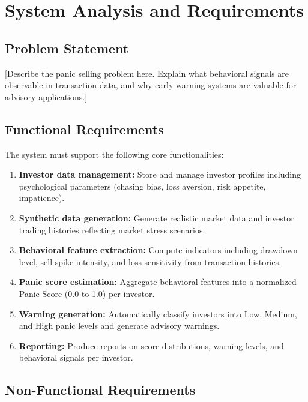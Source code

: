 \chapter{System Analysis and Requirements}
\label{chap:analysis}

\section{Problem Statement}


[Describe the panic selling problem here. Explain what behavioral signals are observable in transaction data, and why early warning systems are valuable for advisory applications.]

\section{Functional Requirements}

The system must support the following core functionalities:

\begin{enumerate}
    \item \textbf{Investor data management:} Store and manage investor profiles including psychological parameters (chasing bias, loss aversion, risk appetite, impatience).
    \item \textbf{Synthetic data generation:} Generate realistic market data and investor trading histories reflecting market stress scenarios.
    \item \textbf{Behavioral feature extraction:} Compute indicators including drawdown level, sell spike intensity, and loss sensitivity from transaction histories.
    \item \textbf{Panic score estimation:} Aggregate behavioral features into a normalized Panic Score (0.0 to 1.0) per investor.
    \item \textbf{Warning generation:} Automatically classify investors into Low, Medium, and High panic levels and generate advisory warnings.
    \item \textbf{Reporting:} Produce reports on score distributions, warning levels, and behavioral signals per investor.
\end{enumerate}

\section{Non-Functional Requirements}

